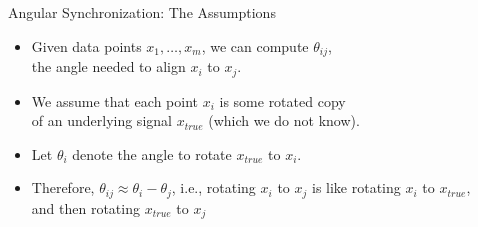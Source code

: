 \documentclass[10pt,aspectratio=169]{beamer}
\begin{document}
\begin{frame}{Angular Synchronization: The Assumptions}

\begin{itemize}
\item Given data points $x_1, \dots, x_m$, we can compute $\theta_{ij}$, \\the angle needed to align $x_i$ to $x_j$.
\item We assume that each point $x_i$ is some rotated copy \\of an underlying signal $x_{true}$ (which we do not know).
\item Let $\theta_i$ denote the angle to rotate $x_{true}$ to $x_i$.
\item Therefore, $\theta_{ij} \approx \theta_i - \theta_j$, i.e., rotating $x_i$ to $x_j$ is like rotating $x_i$ to $x_{true}$, \\and then rotating $x_{true}$ to $x_j$

\end{itemize}

\begin{center}

\end{center}

\end{frame}
\end{document}
